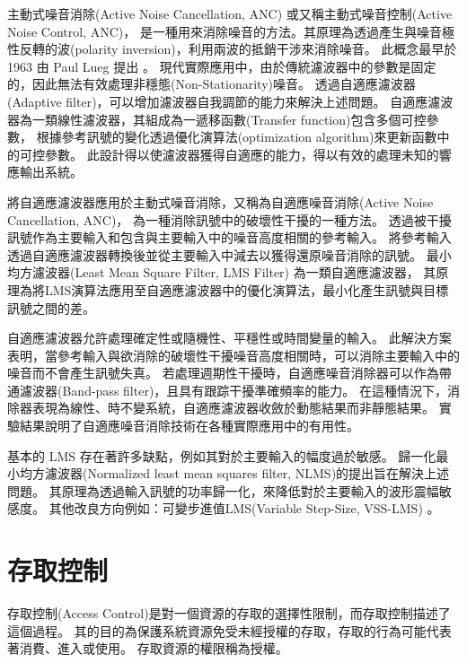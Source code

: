     主動式噪音消除(Active Noise Cancellation, ANC) 或又稱主動式噪音控制(Active Noise Control, ANC)，
是一種用來消除噪音的方法。其原理為透過產生與噪音極性反轉的波(polarity inversion)，利用兩波的抵銷干涉來消除噪音。
此概念最早於 1963 由 Paul Lueg 提出 \cite{elliott1993active}。
現代實際應用中，由於傳統濾波器中的參數是固定的，因此無法有效處理非穩態(Non-Stationarity)噪音。
透過自適應濾波器(Adaptive filter)，可以增加濾波器自我調節的能力來解決上述問題。
自適應濾波器為一類線性濾波器，其組成為一遞移函數(Transfer function)包含多個可控參數，
根據參考訊號的變化透過優化演算法(optimization algorithm)來更新函數中的可控參數。
此設計得以使濾波器獲得自適應的能力，得以有效的處理未知的響應輸出系統\cite{widrow1983adaptive}。

    將自適應濾波器應用於主動式噪音消除，又稱為自適應噪音消除(Active Noise Cancellation, ANC)，
為一種消除訊號中的破壞性干擾的一種方法。
透過被干擾訊號作為主要輸入和包含與主要輸入中的噪音高度相關的參考輸入。
將參考輸入透過自適應濾波器轉換後並從主要輸入中減去以獲得還原噪音消除的訊號。
最小均方濾波器(Least Mean Square Filter, LMS Filter) 為一類自適應濾波器，
其原理為將LMS演算法應用至自適應濾波器中的優化演算法，最小化產生訊號與目標訊號之間的差\cite{widrow1975adaptive}。

    自適應濾波器允許處理確定性或隨機性、平穩性或時間變量的輸入。
此解決方案表明，當參考輸入與欲消除的破壞性干擾噪音高度相關時，可以消除主要輸入中的噪音而不會產生訊號失真。
若處理週期性干擾時，自適應噪音消除器可以作為帶通濾波器(Band-pass filter)，且具有跟踪干擾準確頻率的能力。
在這種情況下，消除器表現為線性、時不變系統，自適應濾波器收斂於動態結果而非靜態結果。
實驗結果說明了自適應噪音消除技術在各種實際應用中的有用性\cite{singh2001adaptive}。

    基本的 LMS 存在著許多缺點，例如其對於主要輸入的幅度過於敏感。
歸一化最小均方濾波器(Normalized least mean squares filter, NLMS)的提出旨在解決上述問題。
其原理為透過輸入訊號的功率歸一化，來降低對於主要輸入的波形震幅敏感度\cite{book198585}。
其他改良方向例如：可變步進值LMS(Variable Step-Size, VSS-LMS) \cite{kwong1992variable}。


\section{存取控制}

    存取控制(Access Control)是對一個資源的存取的選擇性限制\cite{rfc4949}，而存取控制描述了這個過程。
其的目的為保護系統資源免受未經授權的存取，存取的行為可能代表著消費、進入或使用。
存取資源的權限稱為授權\cite{sandhu1994access}。

